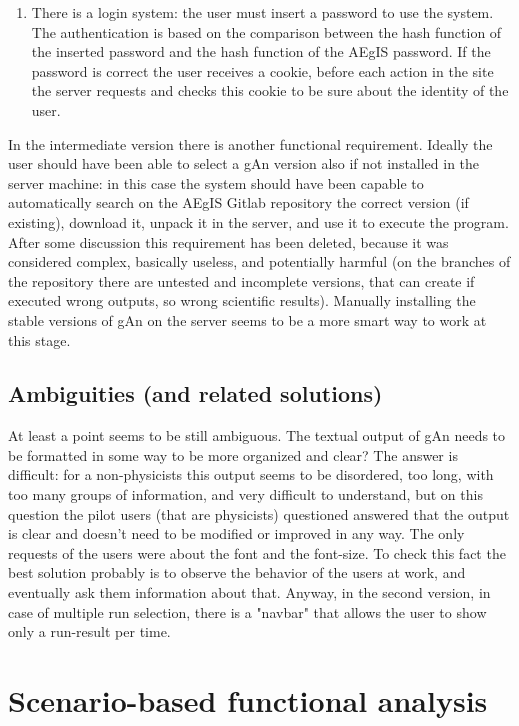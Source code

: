 \begin{enumerate}
\item There is a login system: the user must insert a password to use the system. The authentication is based on the comparison between the hash function of the inserted password and the hash function of the AEgIS password. If the password is correct the user receives a cookie, before each action in the site the server requests and checks this cookie to be sure about the identity of the user.  

\end{enumerate}

In the intermediate version there is another functional requirement. Ideally the user should have been able to select a gAn version also if not installed in the server machine: in this case the system should have been capable to automatically search on the AEgIS Gitlab repository the correct version (if existing), download it, unpack it in the server, and use it to execute the program. 
After some discussion this requirement has been deleted, because it was considered complex, basically useless, and potentially harmful (on the branches of the repository there are untested and incomplete versions, that can create if executed wrong outputs, so wrong scientific results). Manually installing the stable versions of gAn on the server seems to be a more smart way to work at this stage.


\subsection{Ambiguities (and related solutions)}

At least a point seems to be still ambiguous.
The textual output of gAn needs to be formatted in some way to be more organized and clear? 
The answer is difficult: for a non-physicists this output seems to be disordered, too long, with too many groups of information, and very difficult to understand, but on this question the pilot users (that are physicists) questioned answered that the output is clear and doesn't need to be modified or improved in any way. The only requests of the users were about the font and the font-size. To check this fact the best solution probably is to observe the behavior of the users at work, and eventually ask them information about that.
Anyway, in the second version, in case of multiple run selection, there is a "navbar" that allows the user to show only a run-result per time.


\section{Scenario-based functional analysis}

